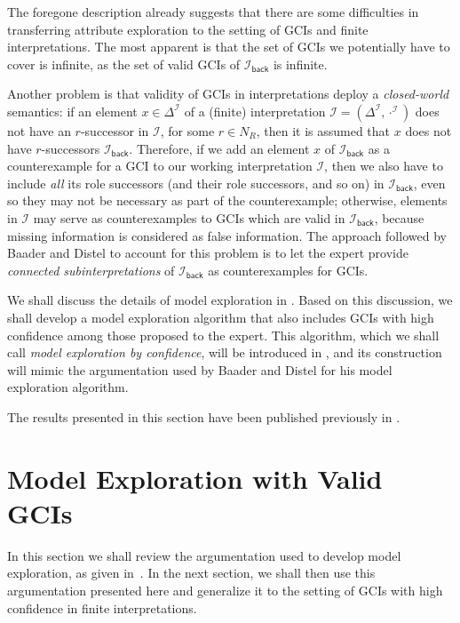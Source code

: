 The foregone description already suggests that there are some difficulties in transferring
attribute exploration to the setting of GCIs and finite interpretations.  The most
apparent is that the set of GCIs we potentially have to cover is infinite, as the set of
valid GCIs of $\mathcal{I}_{\mathsf{back}}$ is infinite.

Another problem is that validity of GCIs in interpretations deploy a \emph{closed-world}
semantics: if an element $x \in \Delta^{\mathcal{I}}$ of a (finite) interpretation
$\mathcal{I} = (\Delta^{\mathcal{I}}, \cdot^{\mathcal{I}})$ does not have an $r$-successor
in $\mathcal{I}$, for some $r \in N_{R}$, then it is assumed that $x$ does not have
$r$-successors $\mathcal{I}_{\mathsf{back}}$.  Therefore, if we add an element $x$ of
$\mathcal{I}_{\mathsf{back}}$ as a counterexample for a GCI to our working interpretation
$\mathcal{I}$, then we also have to include \emph{all} its role successors (and their role
successors, and so on) in $\mathcal{I}_{\mathsf{back}}$, even so they may not be necessary
as part of the counterexample; otherwise, elements in $\mathcal{I}$ may serve as
counterexamples to GCIs which are valid in $\mathcal{I}_{\mathsf{back}}$, because missing
information is considered as false information.  The approach followed by Baader and
Distel to account for this problem is to let the expert provide \emph{connected
  subinterpretations} of $\mathcal{I}_{\mathsf{back}}$ as counterexamples for GCIs.

We shall discuss the details of model exploration in .  Based on
this discussion, we shall develop a model exploration algorithm that also includes GCIs
with high confidence among those proposed to the expert.  This algorithm, which we shall
call \emph{model exploration by confidence}, will be introduced in
, and its construction will mimic the argumentation used by
Baader and Distel for his model exploration algorithm.

The results presented in this section have been published previously in
\cite{Borc-LTCS-13-11}.

\section{Model Exploration with Valid GCIs}
\label{sec:model-expl-with}

In this section we shall review the argumentation used to develop model exploration, as
given in~\cite[Chapter~6]{Diss-Felix}.  In the next section, we shall then use this
argumentation presented here and generalize it to the setting of GCIs with high confidence
in finite interpretations.

